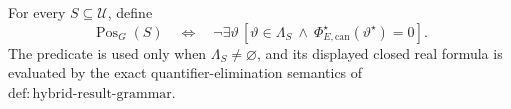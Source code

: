 For every \(S\subseteq\mathcal U\), define
\[
\operatorname{Pos}_G(S)
\quad\Longleftrightarrow\quad
\neg\exists\vartheta\,
\left[\vartheta\in\Lambda_S\ \wedge\
\Phi_{E,\mathrm{can}}^\star(\vartheta^\star)=0\right].
\]
The predicate is used only when \(\Lambda_S\ne\varnothing\), and its displayed
closed real formula is evaluated by the exact quantifier-elimination semantics of
\(\mathrm{def:hybrid\text{-}result\text{-}grammar}\).